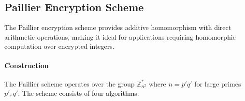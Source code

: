 \subsection{Paillier Encryption Scheme}\label{Appendix:Paillier}

The Paillier encryption scheme provides additive homomorphism with direct arithmetic operations, making it ideal for applications requiring homomorphic computation over encrypted integers.

\paragraph{Construction}
The Paillier scheme operates over the group $\mathbb{Z}_{n^2}^*$ where $n = p'q'$ for large primes $p', q'$. The scheme consists of four algorithms:

